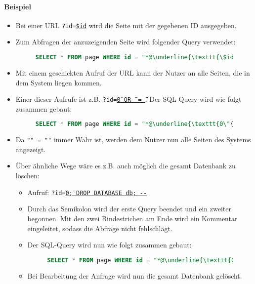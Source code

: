 			\paragraph{Beispiel}
				\begin{itemize}
					\item Bei einer URL \texttt{?id=\underline{\$id}} wird die Seite mit der gegebenen ID ausgegeben.
					\item Zum Abfragen der anzuzeigenden Seite wird folgender Query verwendet:
						\begin{figure}[H]
							\centering
							\begin{lstlisting}[language = SQL]
SELECT * FROM page WHERE id = "*@\underline{\texttt{\$id}}@*";
\end{lstlisting}
						\end{figure}
					\item Mit einem geschickten Aufruf der URL kann der Nutzer an alle Seiten, die in dem System liegen kommen.
					\item Einer dieser Aufrufe ist z.B. \texttt{?id=}\underline{\texttt{0\"{} OR {}\"{}\"{} = \"}}. Der SQL-Query wird wie folgt zusammen gebaut:
						\begin{figure}[H]
							\begin{lstlisting}[language = SQL]
SELECT * FROM page WHERE id = "*@\underline{\texttt{0\"{} OR {}\"{}\"{} = \"}}@*";
\end{lstlisting}
						\end{figure}
					\item Da \texttt{"" = ""} immer Wahr ist, werden dem Nutzer nun alle Seiten des Systems angezeigt.
					\item Über ähnliche Wege wäre es z.B. auch möglich die gesamt Datenbank zu löschen:
						\begin{itemize}
							\item Aufruf: \texttt{?id=\underline{0\"; DROP DATABASE db; -{}-}}
							\item Durch das Semikolon wird der erste Query beendet und ein zweiter begonnen. Mit den zwei Bindestrichen am Ende wird ein Kommentar eingeleitet, sodass die Abfrage nicht fehlschlägt.
							\item Der SQL-Query wird nun wie folgt zusammen gebaut:
								\begin{figure}[H]
									\begin{lstlisting}[language = SQL]
SELECT * FROM page WHERE id = "*@\underline{\texttt{0\"; DROP DATABASE db; -{}-}}@*";
\end{lstlisting}
								\end{figure}
							\item Bei Bearbeitung der Anfrage wird nun die gesamt Datenbank gelöscht.
						\end{itemize}
				\end{itemize}

